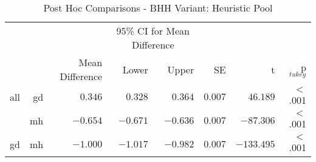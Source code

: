 \begin{table}[htbp]
      \centering
      \caption{Post Hoc Comparisons - BHH Variant: Heuristic Pool}
      \label{tab:results:heuristic_pool:post_hoc}%
      \par\bigskip
      \resizebox{\textwidth}{!}
      {
            \begin{tabular}{lrrrrrrr}
                  \toprule
                  \multicolumn{1}{c}{} & \multicolumn{1}{c}{} & \multicolumn{1}{c}{} & \multicolumn{2}{c}{95\% CI for Mean Difference} & \multicolumn{1}{c}{} & \multicolumn{1}{c}{} & \multicolumn{1}{c}{}               \\
                  \cline{4-5}
                  $ $                  & $ $                  & Mean Difference      & Lower                                           & Upper                & SE                   & t                    & p$_{tukey}$ \\
                  \cmidrule[0.4pt]{1-8}
                  all                  & gd                   & $0.346$              & $0.328$                                         & $0.364$              & $0.007$              & $46.189$             & $<$ .001    \\
                  $ $                  & mh                   & $-0.654$             & $-0.671$                                        & $-0.636$             & $0.007$              & $-87.306$            & $<$ .001    \\
                  gd                   & mh                   & $-1.000$             & $-1.017$                                        & $-0.982$             & $0.007$              & $-133.495$           & $<$ .001    \\
                  \bottomrule
            \end{tabular}
      }
\end{table}

